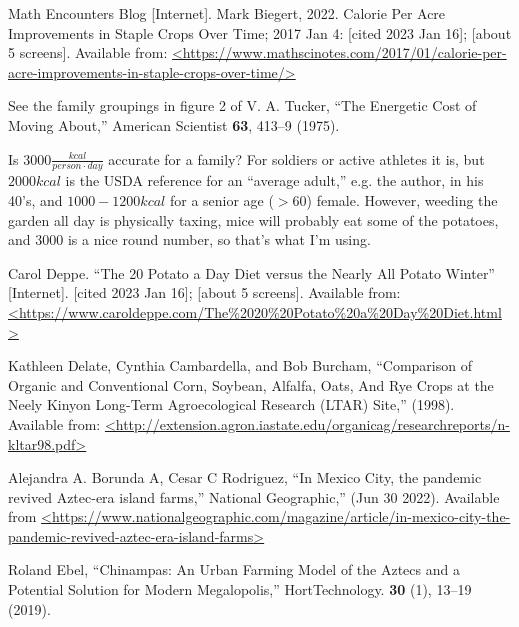 \documentclass[prb,preprint]{revtex4-2}
\begin{document}
\begin{thebibliography}{99}
Math Encounters Blog [Internet].
Mark Biegert, 2022.
Calorie Per Acre Improvements in Staple Crops Over Time;
2017 Jan 4: [cited 2023 Jan 16]; [about 5 screens].
Available from: \url{<https://www.mathscinotes.com/2017/01/calorie-per-acre-improvements-in-staple-crops-over-time/>}



See the family groupings in figure 2 of 
V. A. Tucker,
``The Energetic Cost of Moving About,''
American Scientist \textbf{63}, 
 413--9 (1975).

Is $3000\frac{kcal}{person\cdot day}$ accurate for a family?  For soldiers or active athletes it is, but $2000kcal$ is the USDA reference for an ``average adult,'' e.g. the author, in his 40's, and   $1000-1200kcal$ for a senior age ($>60$) female.  However, weeding the garden all day is physically taxing, mice will probably eat some of the potatoes, and $3000$ is a nice round number, so that's what I'm using.

Carol Deppe.
``The 20 Potato a Day Diet versus the Nearly All Potato Winter'' [Internet].
[cited 2023 Jan 16]; [about 5 screens].
Available from: 
\url{<https://www.caroldeppe.com/The\%2020\%20Potato\%20a\%20Day\%20Diet.html>}


Kathleen Delate, Cynthia Cambardella, and Bob Burcham,
``Comparison of Organic and Conventional Corn, 
Soybean, Alfalfa, Oats, And Rye Crops at the Neely Kinyon Long-Term Agroecological Research (LTAR) Site,''
(1998).
Available from: \url{<http://extension.agron.iastate.edu/organicag/researchreports/n-kltar98.pdf>} 

Alejandra A. Borunda A, Cesar C Rodriguez,
``In Mexico City, the pandemic revived Aztec-era island farms,''
National Geographic,''
(Jun 30 2022).
Available from \url{<https://www.nationalgeographic.com/magazine/article/in-mexico-city-the-pandemic-revived-aztec-era-island-farms>}

Roland Ebel,
``Chinampas: An Urban Farming Model of the Aztecs and a Potential Solution for Modern Megalopolis,''
HortTechnology.
\textbf{30} (1), 13--19
(2019). 


\end{thebibliography}
\end{document}

